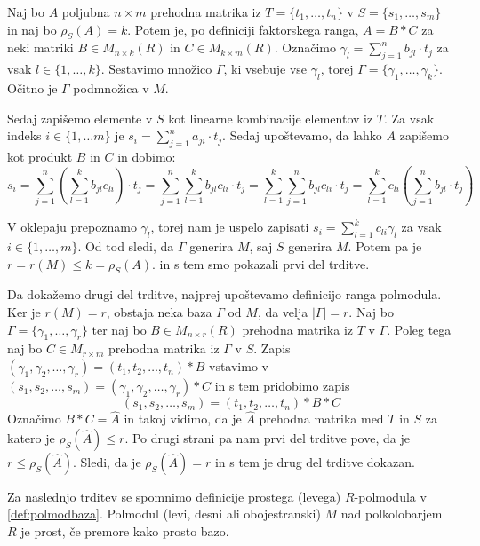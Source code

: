 \documentclass[mat1]{fmfdelo}
\newcommand{\abs}[1]{\ensuremath{\lvert #1 \rvert}}
\begin{document}
\begin{dokaz}
		Naj bo $A$ poljubna $n\times m$ prehodna matrika iz $T = \{t_1, \ldots, t_n\}$ v $S = \{s_1, \ldots, s_m\}$ in naj bo $\rho_S(A) = k$. Potem je, po definiciji faktorskega ranga, $A = B*C$ za neki matriki $B\in M_{n\times k}(R)$ in $C\in M_{k\times m}(R)$. Označimo $\gamma_l =\sum_{j = 1}^{n}b_{jl}\cdot t_j$ za vsak $l\in \{1, \ldots, k\}$. Sestavimo množico $\Gamma$, ki vsebuje vse $\gamma_l$, torej $\Gamma = \{\gamma_1, \ldots, \gamma_k\}$. Očitno je $\Gamma$ podmnožica v $M$.
		
		Sedaj zapišemo elemente v $S$ kot linearne kombinacije elementov iz $T$. Za vsak indeks $i\in\{1, \ldots m\}$ je $s_i = \sum_{j = 1}^{n} a_{ji}\cdot t_j$. Sedaj upoštevamo, da lahko $A$ zapišemo kot produkt $B$ in $C$ in dobimo:  $$s_i = \sum_{j=1}^{n} \left(\sum_{l = 1}^{k}b_{jl}c_{li}\right)\cdot t_j = \sum_{j=1}^{n}\sum_{l = 1}^{k}b_{jl}c_{li}\cdot t_j = \sum_{l=1}^{k}\sum_{j = 1}^{n}b_{jl}c_{li}\cdot t_j = \sum_{l=1}^{k}c_{li}\left(\sum_{j = 1}^{n}b_{jl}\cdot t_j\right)$$
		
		V oklepaju prepoznamo $\gamma_l$, torej nam je uspelo zapisati $s_i = \sum_{l = 1}^{k} c_{li}\gamma_l$ za vsak $i\in \{1, \ldots, m\}$. Od tod sledi, da $\Gamma$ generira $M$, saj $S$ generira $M$. Potem pa je $r = r(M) \leq k = \rho_S(A).$ in s tem smo pokazali prvi del trditve.
		
		Da dokažemo drugi del trditve, najprej upoštevamo definicijo ranga polmodula. Ker je $r(M) = r$, obstaja neka baza $\Gamma$ od $M$, da velja $\abs{\Gamma} = r$. Naj bo $\Gamma = \{\gamma_1, \ldots, \gamma_r\}$ ter naj bo $B \in M_{n\times r}(R)$ prehodna matrika iz $T$ v $\Gamma$. Poleg tega naj bo $C\in M_{r\times m}$ prehodna matrika iz $\Gamma$ v $S$. Zapis $(\gamma_1, \gamma_2, \ldots, \gamma_r) = (t_1, t_2, \ldots, t_n)*B$ vstavimo v $(s_1, s_2, \ldots, s_m) = (\gamma_1, \gamma_2, \ldots, \gamma_r)*C$ in s tem pridobimo zapis $$(s_1, s_2, \ldots, s_m) = (t_1, t_2, \ldots, t_n)*B*C$$ Označimo $B*C = \widehat{A}$ in takoj vidimo, da je $\widehat{A}$ prehodna matrika med $T$ in $S$ za katero je $\rho_S(\widehat{A}) \leq r$. Po drugi strani pa nam prvi del trditve pove, da je $r \leq \rho_S(\widehat{A})$. Sledi, da je $\rho_S(\widehat{A}) = r$ in s tem je drug del trditve dokazan.
\end{dokaz}

Za naslednjo trditev se spomnimo definicije prostega (levega) $R$-polmodula v \ref{def:polmodbaza}. Polmodul (levi, desni ali obojestranski) $M$ nad polkolobarjem $R$ je prost, če premore kako prosto bazo.
\end{document}
